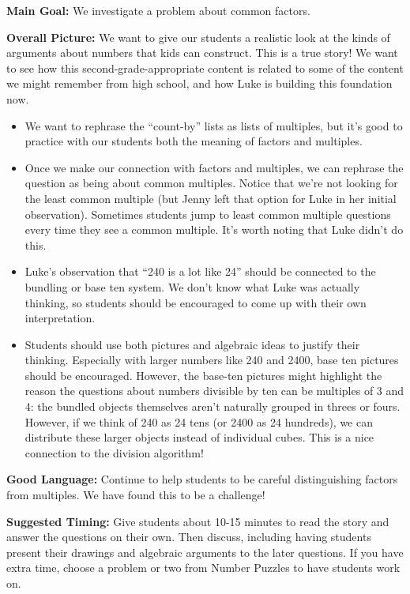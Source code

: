\documentclass{ximera}
\begin{document}
\newpage
\begin{instructorNotes}

{\bf Main Goal:} We investigate a problem about common factors.


{\bf Overall Picture:} We want to give our students a realistic look at the kinds of arguments about numbers that kids can construct. This is a true story! We want to see how this second-grade-appropriate content is related to some of the content we might remember from high school, and how Luke is building this foundation now.

\begin{itemize}
\item We want to rephrase the ``count-by'' lists as lists of multiples, but it’s good to practice with our students both the meaning of factors and multiples.
\item Once we make our connection with factors and multiples, we can rephrase the question as being about common multiples. Notice that we’re not looking for the least common multiple (but Jenny left that option for Luke in her initial observation). Sometimes students jump to least common multiple questions every time they see a common multiple. It’s worth noting that Luke didn’t do this.
\item Luke’s observation that ``240 is a lot like 24'' should be connected to the bundling or base ten system. We don’t know what Luke was actually thinking, so students should be encouraged to come up with their own interpretation. 
\item Students should use both pictures and algebraic ideas to justify their thinking. Especially with larger numbers like 240 and 2400, base ten pictures should be encouraged. However, the base-ten pictures might highlight the reason the questions about numbers divisible by ten can be multiples of 3 and 4: the bundled objects themselves aren’t naturally grouped in threes or fours. However, if we think of 240 as 24 tens (or 2400 as 24 hundreds), we can distribute these larger objects instead of individual cubes. This is a nice connection to the division algorithm!

\end{itemize}




{\bf Good Language:} Continue to help students to be careful distinguishing factors from multiples. We have found this to be a challenge!



{\bf Suggested Timing:} Give students about 10-15 minutes to read the story and answer the questions on their own. Then discuss, including having students present their drawings and algebraic arguments to the later questions. If you have extra time, choose a problem or two from Number Puzzles to have students work on.

\end{instructorNotes}
\end{document}
